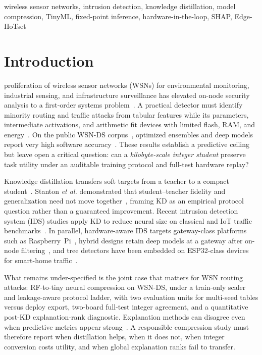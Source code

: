 \documentclass[journal]{IEEEtran}
\newcommand{\dataset}{WSN-DS}
\begin{document}
\begin{IEEEkeywords}
wireless sensor networks, intrusion detection, knowledge distillation, model compression, TinyML, fixed-point inference, hardware-in-the-loop, SHAP, Edge-IIoTset
\end{IEEEkeywords}

\section{Introduction}
\label{sec:intro}
 proliferation of wireless sensor networks (WSNs) for environmental monitoring, industrial sensing, and infrastructure surveillance has elevated on-node security analysis to a first-order systems problem~\cite{ghadi2024review}.
A practical detector must identify minority routing and traffic attacks from tabular features while its parameters, intermediate activations, and arithmetic fit devices with limited flash, RAM, and energy~\cite{banbury2021benchmarking,sze2017efficient}.
On the public \dataset{} corpus~\cite{almomani2016wsnds}, optimized ensembles and deep models report very high software accuracy~\cite{talukder2024mlstl,talukder2025hybrid,birahim2025pso,pandey2025tabu,nguyen2024gswo}.
These results establish a predictive ceiling but leave open a critical question: can a \emph{kilobyte-scale integer student} preserve task utility under an auditable training protocol and full-test hardware replay?

Knowledge distillation transfers soft targets from a teacher to a compact student~\cite{hinton2015distilling}.
Stanton \emph{et al.} demonstrated that student--teacher fidelity and generalization need not move together~\cite{stanton2021kd}, framing KD as an empirical protocol question rather than a guaranteed improvement.
Recent intrusion detection system (IDS) studies apply KD to reduce neural size on classical and IoT traffic benchmarks~\cite{yang2023selfkd,wisanwanichthan2025kd,yagiz2025lens,benaddi2025lightweight,peng2025fdids,hossain2025federatedkd}.
In parallel, hardware-aware IDS targets gateway-class platforms such as Raspberry~Pi~\cite{diab2025hardware}, hybrid designs retain deep models at a gateway after on-node filtering~\cite{alfarra2025energy}, and tree detectors have been embedded on ESP32-class devices for smart-home traffic~\cite{javed2024thermostat}.

What remains under-specified is the joint case that matters for WSN routing attacks: RF-to-tiny neural compression on \dataset{}, under a train-only scaler and leakage-aware protocol ladder, with two evaluation units for multi-seed tables versus deploy export, two-board full-test integer agreement, and a quantitative post-KD explanation-rank diagnostic.
Explanation methods can disagree even when predictive metrics appear strong~\cite{krishna2022disagreement,adebayo2018sanity,lundberg2017shap}.
A responsible compression study must therefore report when distillation helps, when it does not, when integer conversion costs utility, and when global explanation ranks fail to transfer.
\end{document}
